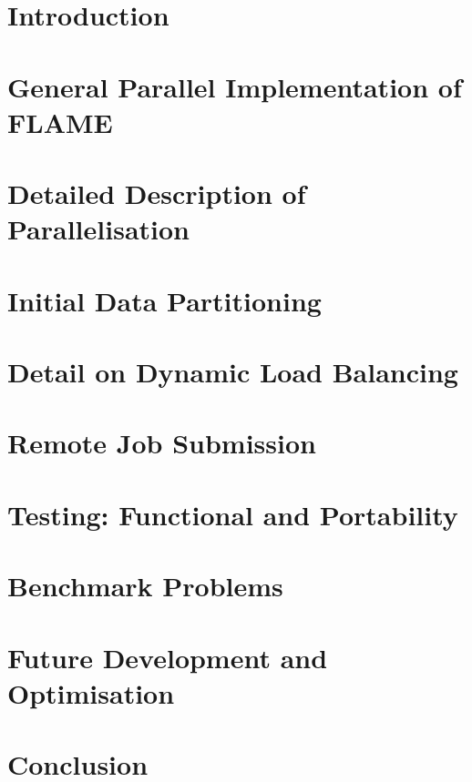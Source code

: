 \documentclass[a4paper,11pt]{article}
\begin{document}
%

%
\section{Introduction}	
\section{General Parallel Implementation of FLAME} 
\section{Detailed Description of Parallelisation} 
\section{Initial Data Partitioning} 
\section{Detail on Dynamic Load Balancing} 
\section{Remote Job Submission} 
\section{Testing: Functional and Portability} 
\section{Benchmark Problems} 
\section{Future Development and Optimisation} 
\section{Conclusion} 

\end{document}
